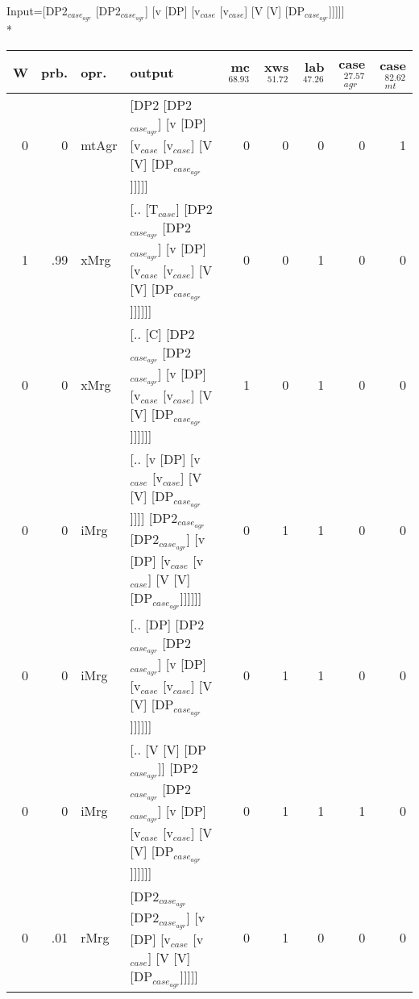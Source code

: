 \begingroup\scriptsize Input=[DP2$_{case_{agr}}$ [DP2$_{case_{agr}}$] [v [DP] [v$_{case}$ [v$_{case}$] [V [V] [DP$_{case_{agr}}$]]]]]\\*
\begin{tabularx}{\linewidth}{rrlXrrrrr}
\hline
   W &   prb. & opr.    & output                                                                                                                               &   mc$^{68.93}$ &   xws$^{51.72}$ &   lab$^{47.26}$ &   case$_{agr}^{27.57}$ &   case$_{mt}^{82.62}$ \\
\hline
   0 &   0 & mtAgr & [DP2 [DP2$_{case_{agr}}$] [v [DP] [v$_{case}$ [v$_{case}$] [V [V] [DP$_{case_{agr}}$]]]]]                                                                &            0 &             0 &             0 &                  0 &                 1 \\
   1 &   .99 & xMrg  & [.. [T$_{case}$] [DP2$_{case_{agr}}$ [DP2$_{case_{agr}}$] [v [DP] [v$_{case}$ [v$_{case}$] [V [V] [DP$_{case_{agr}}$]]]]]]                                         &            0 &             0 &             1 &                  0 &                 0 \\
   0 &   0 & xMrg  & [.. [C] [DP2$_{case_{agr}}$ [DP2$_{case_{agr}}$] [v [DP] [v$_{case}$ [v$_{case}$] [V [V] [DP$_{case_{agr}}$]]]]]]                                              &            1 &             0 &             1 &                  0 &                 0 \\
   0 &   0 & iMrg  & [.. [v [DP] [v$_{case}$ [v$_{case}$] [V [V] [DP$_{case_{agr}}$]]]] [DP2$_{case_{agr}}$ [DP2$_{case_{agr}}$] [v [DP] [v$_{case}$ [v$_{case}$] [V [V] [DP$_{case_{agr}}$]]]]]] &            0 &             1 &             1 &                  0 &                 0 \\
   0 &   0 & iMrg  & [.. [DP] [DP2$_{case_{agr}}$ [DP2$_{case_{agr}}$] [v [DP] [v$_{case}$ [v$_{case}$] [V [V] [DP$_{case_{agr}}$]]]]]]                                             &            0 &             1 &             1 &                  0 &                 0 \\
   0 &   0 & iMrg  & [.. [V [V] [DP$_{case_{agr}}$]] [DP2$_{case_{agr}}$ [DP2$_{case_{agr}}$] [v [DP] [v$_{case}$ [v$_{case}$] [V [V] [DP$_{case_{agr}}$]]]]]]                            &            0 &             1 &             1 &                  1 &                 0 \\
   0 &   .01 & rMrg  & [DP2$_{case_{agr}}$ [DP2$_{case_{agr}}$] [v [DP] [v$_{case}$ [v$_{case}$] [V [V] [DP$_{case_{agr}}$]]]]]                                                       &            0 &             1 &             0 &                  0 &                 0 \\
\hline
\end{tabularx}\endgroup\\
